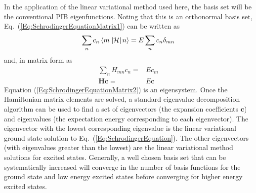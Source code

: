 In the application of the linear variational method used here, the basis set will be the conventional PIB eigenfunctions. Noting that this is an orthonormal basis set, Eq.~(\ref{Eq:SchrodingerEquationMatrix1}) can be written as
%
\begin{equation}\label{Eq:SchrodingerEquationMatrix1}
\displaystyle
  \sum_n{c_n \braketop{m}{\mathcal{H}}{n}} = E\sum_n{c_n\delta_{mn}}
\end{equation}
%
and, in matrix form as
%
\begin{equation}\label{Eq:SchrodingerEquationMatrix2}
\displaystyle
\begin{aligned}
  \sum_n{H_{mn}c_{n}} ={}& Ec_m  \\
  \mathbf{Hc} ={}& E\mathbf{c}
\end{aligned}
\end{equation}
%
Equation (\ref{Eq:SchrodingerEquationMatrix2}) is an eigensystem. Once the Hamiltonian matrix elements are solved, a standard eigenvalue decomposition algorithm can be used to find a set of eigenvectors (the expansion coefficients $\mathbf{c}$) and eigenvalues (the expectation energy corresponding to each eigenvector). The eigenvector with the lowest corresponding eigenvalue is the linear variational ground state solution to Eq.~(\ref{Eq:SchrodingerEquation}). The other eigenvectors (with eigenvalues greater than the lowest) are the linear variational method solutions for excited states. Generally, a well chosen basis set that can be systematically increased will converge in the number of basis functions for the ground state and low energy excited states before converging for higher energy excited states.


%
%
%

